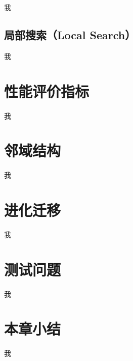 我

\subsection{局部搜索（Local Search）}

我

\section{性能评价指标}

我

\section{邻域结构}

我

\section{进化迁移}

我

\section{测试问题}

我

\section{本章小结}

我